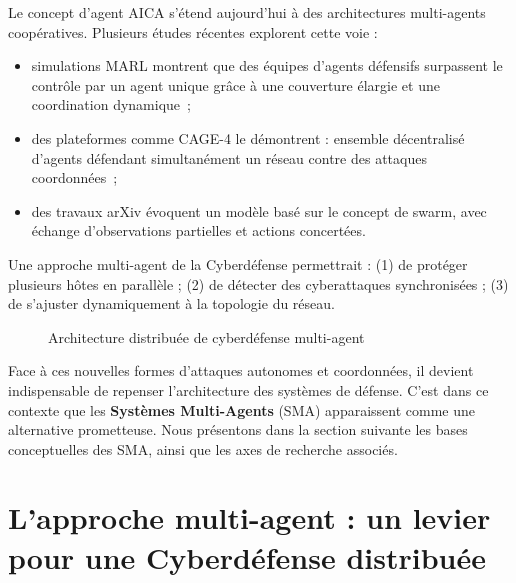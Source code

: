 \documentclass[ twoside,openright,titlepage,numbers=noenddot,headinclude,%
                footinclude=true,cleardoublepage=empty,abstractoff, %
                BCOR=5mm,paper=a4,fontsize=11pt,%
                french,american,%
                ]{scrreprt}
\begin{document}
Le concept d'agent AICA s'étend aujourd'hui à des architectures multi-agents coopératives. Plusieurs études récentes explorent cette voie :
\begin{itemize}
    \item simulations MARL montrent que des équipes d'agents défensifs surpassent le contrôle par un agent unique grâce à une couverture élargie et une coordination dynamique~\cite{RLResilientCyberdefense2024};
    \item des plateformes comme CAGE-4 le démontrent : ensemble décentralisé d'agents défendant simultanément un réseau contre des attaques coordonnées~\cite{cage_challenge_3_announcement};
    \item des travaux arXiv évoquent un modèle basé sur le concept de swarm, avec échange d'observations partielles et actions concertées.
\end{itemize}
Une approche multi-agent de la Cyberdéfense permettrait : (1) de protéger plusieurs hôtes en parallèle ; (2) de détecter des cyberattaques synchronisées ; (3) de s'ajuster dynamiquement à la topologie du réseau.

\begin{figure}[h]
    \centering
    \caption{Architecture distribuée de cyberdéfense multi-agent}
    \label{fig:distributed_sma}
\end{figure}

\noindent
Face à ces nouvelles formes d'attaques autonomes et coordonnées, il devient indispensable de repenser l'architecture des systèmes de défense. C'est dans ce contexte que les \textbf{Systèmes Multi-Agents} (SMA) apparaissent comme une alternative prometteuse. Nous présentons dans la section suivante les bases conceptuelles des SMA, ainsi que les axes de recherche associés.

\section{L'approche multi-agent : un levier pour une Cyberdéfense distribuée}\label{sec:sma-concepts}

\end{document}
